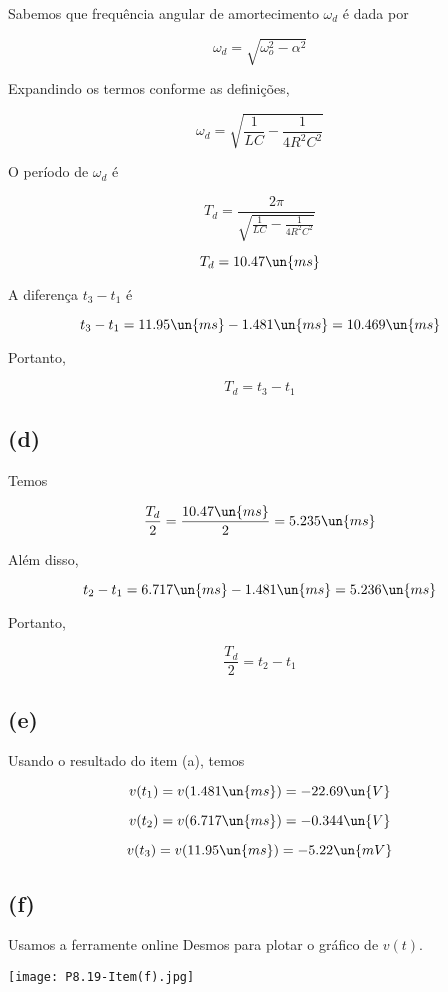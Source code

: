 Sabemos que frequência angular de amortecimento $\omega_d$ é dada por  

\begin{equation}\label{eq:8.19.5}
    \omega_d = \sqrt{\omega_o^2 - \alpha^2}
\end{equation}

Expandindo os termos conforme as definições,

\[ \omega_d = \sqrt{\frac{1}{LC} -  \frac{1}{4R^2C^2}} \]

O período de $\omega_d$ é 

\[ T_d = \frac{2\pi}{\sqrt{\frac{1}{LC} -  \frac{1}{4R^2C^2}} } \]

\[ T_d = 10.47 \un{ms} \]

A diferença $t_3 - t_1$ é

\[ t_3 - t_1 = 11.95 \un{ms} - 1.481 \un{ms} = 10.469 \un{ms} \]

Portanto,   

\[ \boxed{T_d = t_3 - t_1} \]

\subsection*{(d)}

Temos  

\[ \frac{T_d}{2} = \frac{10.47 \un{ms}}{2} = 5.235 \un{ms} \]

Além disso, 

\[ t_2 - t_1 = 6.717 \un{ms} - 1.481 \un{ms} = 5.236 \un{ms} \]

Portanto,  

\[ \boxed{\frac{T_d}{2} = t_2 - t_1} \]

\subsection*{(e)}

Usando o resultado do item (a), temos 

\[ v(t_1) = v(1.481 \un{ms}) = - 22.69 \un{V}   \]

\[ v(t_2) = v(6.717 \un{ms}) = - 0.344 \un{V}   \]

\[ v(t_3) = v(11.95 \un{ms}) = -5.22 \un{mV}   \]

\subsection*{(f)}

Usamos a ferramente online Desmos para plotar o gráfico de $v(t)$.

\begin{center}
    \texttt{[image: P8.19-Item(f).jpg]}
\end{center}

